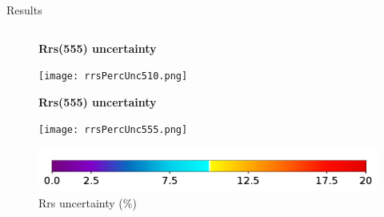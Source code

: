 \documentclass[final]{beamer}
\newlength{\sepwid}
\newlength{\onecolwid}
\newlength{\twocolwid}
\begin{document}
\begin{frame}[t]
\begin{columns}[t]
\begin{column}{\twocolwid}
\begin{block}{Results}
\begin{columns}[t,totalwidth=\twocolwid]
\begin{column}{\onecolwid}
\begin{figure}
\centering
\textbf{Rrs(555) uncertainty}\par\medskip
\texttt{[image: rrsPercUnc510.png]}
\end{figure}

\begin{figure}
\centering
\textbf{Rrs(555) uncertainty}\par\medskip
\texttt{[image: rrsPercUnc555.png]}
\end{figure}

\begin{figure}
\centering
\includegraphics[width=1.0\linewidth]{rrsUNCcolorbar.png}
\\{Rrs uncertainty (\%)}\par\medskip
\end{figure}

\end{column} %

\end{columns} %
\end{block}



\begin{columns}[t,totalwidth=\twocolwid] %
\begin{column}{\onecolwid} %







\end{column} %

\end{columns} %

\end{column} %



\end{columns}
\end{frame}
\end{document}
